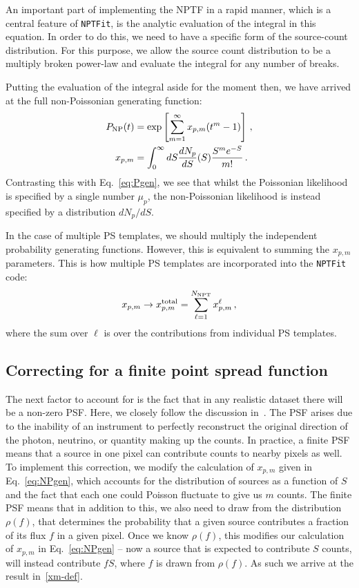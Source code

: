 An important part of implementing the NPTF in a rapid manner, which is a central feature of \texttt{NPTFit}, is the analytic evaluation of the integral in this equation. In order to do this, we need to have a specific form of the source-count distribution. For this purpose, we allow the source count distribution to be a multiply broken power-law and evaluate the integral for any number of breaks. %

Putting the evaluation of the integral aside for the moment then, we have arrived at the full non-Poissonian generating function:
\begin{equation}\begin{aligned}
P_{\rm NP}(t) &= \exp \left[ \sum_{m=1}^{\infty} x_{p,m} (t^m - 1) \right]\,, \\
x_{p,m} &= \int_0^{\infty} dS \frac{dN_p}{dS}(S) \frac{S^m e^{-S}}{m!}\,.
\label{eq:NPgen}
\end{aligned}\end{equation}
Contrasting this with Eq.~\eqref{eq:Pgen}, we see that whilst the Poissonian likelihood is specified by a single number $\mu_p$, the non-Poissonian likelihood is instead specified by a distribution $dN_p/dS$.

In the case of multiple PS templates, we should multiply the independent probability generating functions.  However, this is equivalent to summing the $x_{p,m}$ parameters.  This is how multiple PS templates are incorporated into the \texttt{NPTFit} code:
\begin{equation}
x_{p,m} \to x_{p,m}^{\rm total} = \sum_{\ell=1}^{N_{\rm NPT}} x_{p,m}^{\ell}\,,
\end{equation}
where the sum over $\ell$ is over the contributions from individual PS templates. 

\subsection{Correcting for a finite point spread function}

The next factor to account for is the fact that in any realistic dataset there will be a non-zero PSF.  Here, we closely follow the discussion in~\cite{Malyshev:2011zi}. The PSF arises due to the inability of an instrument to perfectly reconstruct the original direction of the photon, neutrino, or quantity making up the counts. In practice, a finite PSF means that a source in one pixel can contribute counts to nearby pixels as well. To implement this correction, we modify the calculation of $x_{p,m}$ given in Eq.~\eqref{eq:NPgen}, which accounts for the distribution of sources as a function of $S$ and the fact that each one could Poisson fluctuate to give us $m$ counts. The finite PSF means that in addition to this, we also need to draw from the distribution $\rho(f)$, that determines the probability that a given source contributes a fraction of its flux $f$ in a given pixel. Once we know $\rho(f)$, this modifies our calculation of $x_{p,m}$ in Eq.~\eqref{eq:NPgen} -- now a source that is expected to contribute $S$ counts, will instead contribute $f S$, where $f$ is drawn from $\rho(f)$. As such we arrive at the result in~\eqref{xm-def}.


